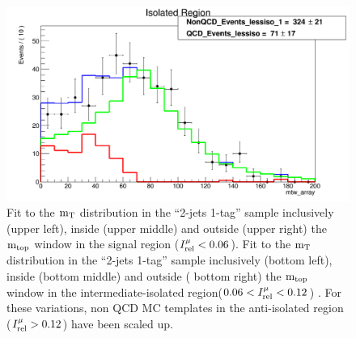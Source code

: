 {\begin{figure}[h!]
{\begin{centering}
\includegraphics[scale=0.2]{figures/2J1T/MTW_fit_2j1t_lessiso_SR_nonQCDMCTemplatesScaledUp}
\par\end{centering}
}

\caption{Fit to the ${\rm m_{T}}$ distribution in the \textquotedblleft{}2-jets
1-tag\textquotedblright{} sample inclusively (upper left), inside
(upper middle) and outside (upper right) the ${\rm m_{top}}$ window in
the signal region ($I_{\rm rel}^{\mu} < 0.06$). Fit to the ${\rm m_{T}}$ distribution in the
\textquotedblleft{}2-jets 1-tag\textquotedblright{} sample inclusively
(bottom left), inside (bottom middle) and outside ( bottom right) the ${\rm m_{top}}$
window in the intermediate-isolated region($0.06 < I_{\rm rel}^{\mu} < 0.12$) . For these variations,
non QCD MC templates in the anti-isolated region ($I_{\rm rel}^{\mu} > 0.12$) have been scaled
up.}
\end{figure}


}
